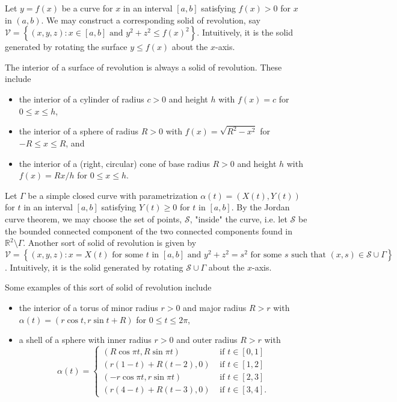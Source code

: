 \documentclass[12pt]{article}
\begin{document}
Let $y=f(x)$ be a curve for $x$ in an interval $[a,b]$ satisfying $f(x)> 0$ for $x$ in $(a,b)$. We may construct a corresponding solid of revolution, say $\mathcal{V}=\left \{(x,y,z): x \in [a,b] \mbox{ and } y^2+z^2\leq f\left(x\right)^2\right \}$. Intuitively, it is the solid generated by rotating the surface $y\leq f(x)$ about the $x$-axis.

The interior of a surface of revolution is always a solid of revolution. These include
\begin{itemize}
\item
the interior of a cylinder of radius $c>0$ and height $h$ with $f(x)=c$ for $0\leq x\leq h$,
\item
the interior of a sphere of radius $R>0$ with $f(x)=\sqrt{R^2-x^2}$ for $-R\leq x \leq R$, and
\item
the interior of a (right, circular) cone of base radius $R>0$ and height $h$ with $f(x)=Rx/h$ for $0\leq x\leq h$.
\end{itemize}

Let $\Gamma$ be a simple closed curve with parametrization $\alpha\left(t\right)=\left(X\left(t\right),Y\left(t\right)\right)$ 
for $t$ in an interval $[a,b]$ satisfying $Y\left(t\right)\geq 0$ for $t$ in $[a,b]$. 
By the Jordan curve theorem, we may choose the set of points, $\mathcal{S}$, "inside" the curve, 
i.e. let $\mathcal{S}$ be the bounded connected component of the two connected components
 found in $\mathbb{R}^2\setminus \Gamma$. 
Another sort of solid of revolution is given by 
$\mathcal{V}=\left \{ (x,y,z): x=X(t) \mbox{ for some } t \mbox{ in } [a,b] \mbox{ and } y^2+z^2=s^2 \mbox{ for some } s \mbox{ such that } (x,s)\in \mathcal{S} \cup \Gamma \right \}$. 
Intuitively, it is the solid generated by rotating $\mathcal{S}\cup \Gamma$ about the $x$-axis.

Some examples of this sort of solid of revolution include
\begin{itemize}
\item
the interior of a torus of minor radius $r>0$ and major radius $R>r$ with $\alpha\left(t\right)=\left(r\cos t,r \sin t+R\right)$ for $0\leq t\leq 2\pi$,
\item
a shell of a sphere with inner radius $r>0$ and outer radius $R>r$ with 
\[
\alpha\left(t\right)=\begin{cases} \left(R\cos \pi t, R\sin \pi t\right) & \mbox{ if } t \in [0,1] \\
\left(r\left(1-t\right)+R\left(t-2\right),0\right) & \mbox{ if } t \in [1,2]\\
\left(-r\cos \pi t,r\sin \pi t\right) & \mbox{ if } t \in [2,3]\\
\left(r\left(4-t\right)+R\left(t-3\right),0\right) & \mbox{ if } t \in [3,4].    \end{cases}
\]


\end{itemize}
\end{document}
